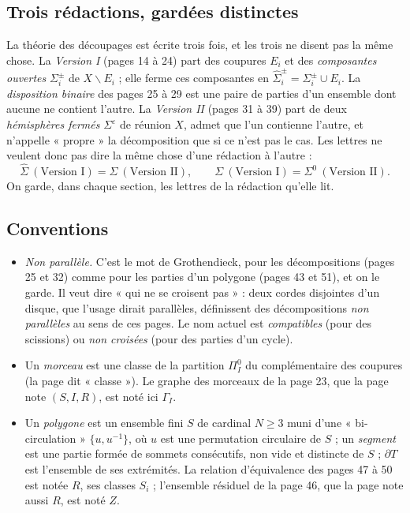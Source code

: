 \documentclass[11pt,a4paper]{article}
\begin{document}
\subsection*{Trois rédactions, gardées distinctes}

La théorie des découpages est écrite trois fois, et les trois ne disent pas
la même chose. La \emph{Version I} (pages 14 à 24) part des coupures $E_i$ et
des \emph{composantes ouvertes} $\Sigma_i^{\pm}$ de $X \smallsetminus E_i$ ;
elle ferme ces composantes en $\widehat{\Sigma}_i^{\pm} = \Sigma_i^{\pm} \cup
E_i$. La \emph{disposition binaire} des pages 25 à 29 est une paire de
parties d'un ensemble dont aucune ne contient l'autre. La \emph{Version II}
(pages 31 à 39) part de deux \emph{hémisphères fermés} $\Sigma^{\varepsilon}$
de réunion $X$, admet que l'un contienne l'autre, et n'appelle « propre » la
décomposition que si ce n'est pas le cas. Les lettres ne veulent donc pas
dire la même chose d'une rédaction à l'autre :
\[
\widehat{\Sigma} \ (\text{Version I}) = \Sigma \ (\text{Version II}), \qquad
\Sigma \ (\text{Version I}) = \Sigma^{0} \ (\text{Version II}).
\]
On garde, dans chaque section, les lettres de la rédaction qu'elle lit.

\subsection*{Conventions}

\begin{itemize}
  \item \emph{Non parallèle.} C'est le mot de Grothendieck, pour les
  décompositions (pages 25 et 32) comme pour les parties d'un polygone (pages
  43 et 51), et on le garde. Il veut dire « qui ne se croisent pas » : deux
  cordes disjointes d'un disque, que l'usage dirait parallèles, définissent
  des décompositions \emph{non parallèles} au sens de ces pages. Le nom
  actuel est \emph{compatibles} (pour des scissions) ou \emph{non croisées}
  (pour des parties d'un cycle).
  \item Un \emph{morceau} est une classe de la partition $\Pi_I^0$ du
  complémentaire des coupures (la page dit « classe »). Le graphe des
  morceaux de la page 23, que la page note $(S, I, R)$, est noté ici
  $\Gamma_I$.
  \item Un \emph{polygone} est un ensemble fini $S$ de cardinal $N \geqslant
  3$ muni d'une « bi-circulation » $\{u, u^{-1}\}$, où $u$ est une permutation
  circulaire de $S$ ; un \emph{segment} est une partie formée de sommets
  consécutifs, non vide et distincte de $S$ ; $\partial T$ est l'ensemble de
  ses extrémités. La relation d'équivalence des pages 47 à 50 est notée $R$,
  ses classes $S_i$ ; l'ensemble résiduel de la page 46, que la page note
  aussi $R$, est noté $Z$.
\end{itemize}
\end{document}
